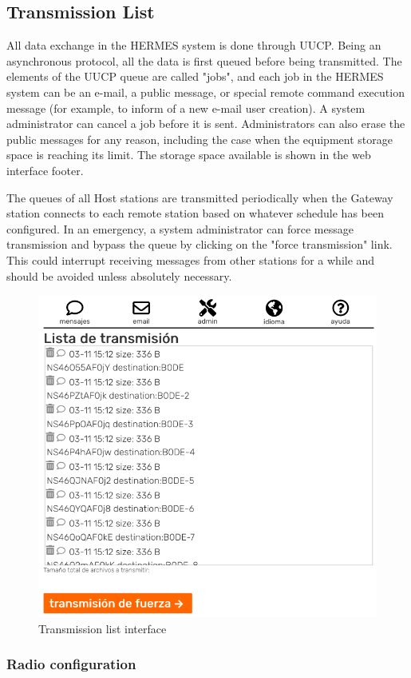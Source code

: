 \documentclass[11pt,a4paper]{article}
\begin{document}
\subsection{Transmission List}
\label{gui_trans_list}

All data exchange in the HERMES system is done through UUCP. Being an asynchronous protocol, all the data is first queued before being transmitted. The elements of the UUCP queue are called "jobs", and each job in the HERMES system can be an e-mail, a public message, or special remote command execution message (for example, to inform of a new e-mail user creation). A system administrator can cancel a job before it is sent. Administrators can also erase the public messages for any reason, including the case when the equipment storage space is reaching its limit. The storage space available is shown in the web interface footer.

The queues of all Host stations are transmitted periodically when the Gateway station connects to each remote station based on whatever schedule has been configured. In an emergency, a system administrator can force message transmission and bypass the queue by clicking on the "force transmission" link. This could interrupt receiving messages from other stations for a while and should be avoided unless absolutely necessary.   
    \begin{figure}[H]
    \centering
    \includegraphics[width=0.5\columnwidth]{screenshots/frontend/es/transmission.png}
    \caption{Transmission list interface}
    \label{fig:transmission}
   
    \end{figure}    
    
    
\subsubsection{Radio configuration}
\label{gui_radio_config}
\end{document}
